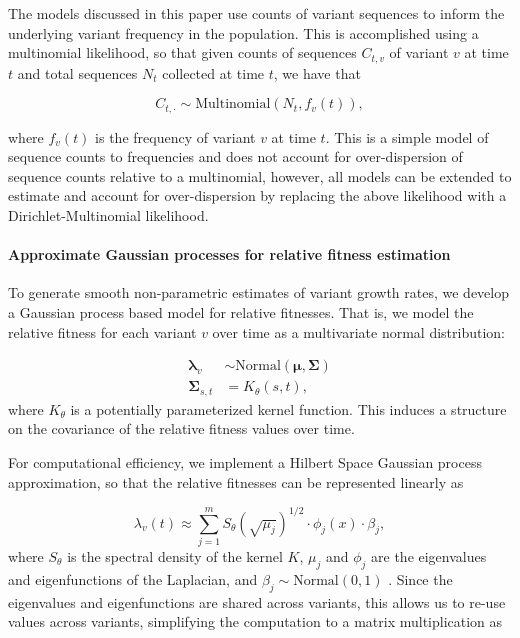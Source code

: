 \documentclass[12pt,oneside,letterpaper]{article}
\renewcommand{\vec}[1]{\boldsymbol{#1}}
\begin{document}
The models discussed in this paper use counts of variant sequences to inform the underlying variant frequency in the population.
This is accomplished using a multinomial likelihood, so that given counts of sequences $C_{t,v}$ of variant $v$ at time $t$ and total sequences $N_{t}$ collected at time $t$, we have that

\begin{equation*}
    C_{t, \cdot} \sim \text{Multinomial}(N_{t}, f_{v}(t)),
\end{equation*}

where $f_{v}(t)$ is the frequency of variant $v$ at time $t$.
This is a simple model of sequence counts to frequencies and does not account for over-dispersion of sequence counts relative to a multinomial, however, all models can be extended to estimate and account for over-dispersion by replacing the above likelihood with a Dirichlet-Multinomial likelihood.

\paragraph{Approximate Gaussian processes for relative fitness estimation}%

To generate smooth non-parametric estimates of variant growth rates, we develop a Gaussian process based model for relative fitnesses.
That is, we model the relative fitness for each variant $v$ over time as a multivariate normal distribution:

\begin{align*}
    \vec{\lambda}_{v} &\sim \text{Normal}(\vec{\mu}, \vec{\Sigma})\\
    \vec{\Sigma}_{s, t} &= K_{\theta}(s, t),
\end{align*}
where $K_{\theta}$ is a potentially parameterized kernel function.
This induces a structure on the covariance of the relative fitness values over time.

For computational efficiency, we implement a Hilbert Space Gaussian process approximation, so that the relative fitnesses can be represented linearly as

\begin{equation}
    \lambda_{v}(t) \approx \sum_{j=1}^{m} S_{\theta}(\sqrt{\mu_{j}})^{1/2} \cdot \phi_{j}(x) \cdot \beta_{j},
\end{equation}
where $S_{\theta}$ is the spectral density of the kernel $K$, $\mu_{j}$ and $\phi_{j}$ are the eigenvalues and eigenfunctions of the Laplacian, and $\beta_{j} \sim \text{Normal}(0,1)$ \cite{riutortmayol2022practical}.
Since the eigenvalues and eigenfunctions are shared across variants, this allows us to re-use values across variants, simplifying the computation to a matrix multiplication as
\end{document}
